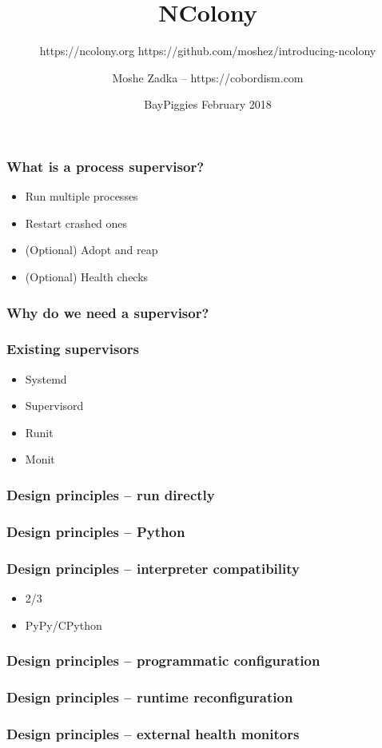 \documentclass{beamer}
\title{NColony}
\subtitle{https://ncolony.org https://github.com/moshez/introducing-ncolony}
\author{Moshe Zadka -- https://cobordism.com}
\date{BayPiggies February 2018}
\begin{document}
 
\frame{\titlepage}

\begin{frame}
\frametitle{What is a process supervisor?}
\begin{itemize}
\item Run multiple processes \pause
\item Restart crashed ones \pause
\item (Optional) Adopt and reap \pause
\item (Optional) Health checks
\end{itemize}
\end{frame}

\begin{frame}
\frametitle{Why do we need a supervisor?}
\end{frame}

\begin{frame}
\frametitle{Existing supervisors}
\begin{itemize}
\item Systemd
\item Supervisord
\item Runit
\item Monit
\end{itemize}
\end{frame}


\begin{frame}
\frametitle{Design principles -- run directly}
\end{frame}

\begin{frame}
\frametitle{Design principles -- Python}
\end{frame}

\begin{frame}
\frametitle{Design principles -- interpreter compatibility}
\begin{itemize}
\item 2/3
\item PyPy/CPython
\end{itemize}
\end{frame}

\begin{frame}
\frametitle{Design principles -- programmatic configuration}
\end{frame}

\begin{frame}
\frametitle{Design principles -- runtime reconfiguration}
\end{frame}

\begin{frame}
\frametitle{Design principles -- external health monitors}
\end{frame}
\end{document}
